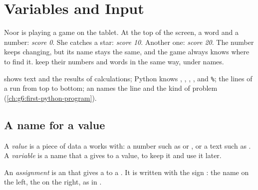 \chapter{Variables and Input}\label{ch:g6:variables-and-input}

Noor is playing a game on the tablet. At the top of the screen, a word and a
number: \emph{score 0}. She catches a star: \emph{score 10}. Another one:
\emph{score 20}. The number keeps changing, but its name stays the same, and the
game always knows where to find it.  keep their numbers and words in
the same way, under names.

\begin{recall}
 shows text and the results of calculations; Python knows
\code{+}, \code{-}, \code{*}, \code{/}, \code{//} and \texttt{\%}; the lines of a
 run from top to bottom; an  names the line and the kind
of problem (\cref{ch:g6:first-python-program}).
\end{recall}

\section{A name for a value}

\begin{definition}\label{def:g6:variables-and-input:value}
A \emph{value} is a piece of data a  works with: a number
such as  or , or a text such as . A
\emph{variable} is a name that a  gives to a value, to
keep it and use it later.
\end{definition}

\begin{definition}[Assignment]\label{def:g6:variables-and-input:assignment}
An \emph{assignment} is an  that gives a  to
a . It is written with the sign \code{=}: the name on the left, the
 on the right, as in .
\end{definition}

